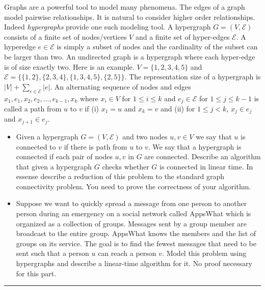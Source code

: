 \documentclass[11pt]{article}
\begin{document}

\item Graphs are a powerful tool to model many phenomena.  The edges
  of a graph model pairwise relationships. It is natural to consider
  higher order relationships.  Indeed {\em hypergraphs} provide one
  such modeling tool.  A hypergraph $G=(V,\mathcal{E})$ consists of a
  finite set of nodes/vertices $V$ and a finite set of hyper-edges
  $\mathcal{E}$. A hyperedge $e \in \mathcal{E}$ is simply a subset of
  nodes and the cardinality of the subset can be larger than two. An
  undirected graph is a hypergraph where each hyper-edge is of size
  exactly two. Here is an example. $V=\{1,2,3,4,5\}$ and $\mathcal{E}
  = \{\{1,2\},\{2,3,4\},\{1,3,4,5\},\{2,5\}\}$. The representation
  size of a hypergraph is $|V| + \sum_{e \in \mathcal{E}} |e|$.  An
  alternating sequence of nodes and edges
  $x_1,e_1,x_2,e_2,\ldots,e_{k-1},x_k$ where $x_i \in V$ for $1 \le i
  \le k$ and $e_j \in \mathcal{E}$ for $1 \le j \le k-1$ is called a
  path from $u$ to $v$ if (i) $x_1 = u$ and $x_k = v$ and (ii) for $1
  \le j < k$, $x_j \in e_j$ and $x_{j+1} \in e_j$.

  \begin{itemize}
  \item Given a hypergraph $G=(V,\mathcal{E})$ and two nodes $u,v \in V$
    we say that $u$ is connected to $v$ if there is path from $u$ to $v$.
    We say that a hypergraph is connected
    if each pair of nodes $u,v$ in $G$ are connected. Describe an algorithm that
    given a hypergraph $G$ checks whether $G$ is connected in linear time.
    In essense describe a reduction of this problem to the standard graph
    connectivity problem. You need to prove the correctness of your algorithm.
  \item Suppose we want to quickly spread a message from one person to
    another person during an emergency on a social network called
    AppsWhat which is organized as a collection of groups. Messages
    sent by a group member are broadcast to the entire group. AppsWhat
    knows the members and the list of groups on its service. The goal
    is to find the fewest messages that need to be sent such that a
    person $u$ can reach a person $v$. Model this problem using
    hypergraphs and describe a linear-time algorithm for it.
    No proof necessary for this part.
  \end{itemize}
\hrule
\end{document}
